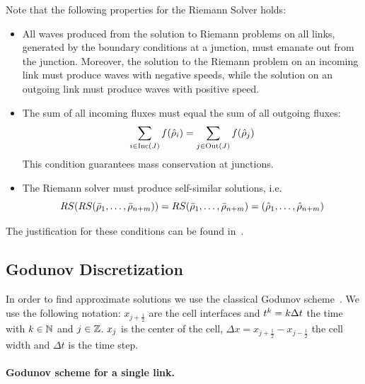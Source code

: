 				
		Note that the following properties for the Riemann Solver holds:
		\begin{itemize}
			\item All waves produced from the solution to Riemann problems on all links,
			generated by the boundary conditions at a junction, must emanate out
			from the junction. Moreover, the solution to the Riemann problem
			on an incoming link must produce waves with negative speeds, while
			the solution on an outgoing link must produce waves with positive
			speed. 
			\item The sum of all incoming fluxes must equal the sum of all outgoing
			fluxes: 
			\[
				\sum_{i\in\Inc\left(\jn\right)}f\left(\trace{\cvar}_{\link}\right)=\sum_{j\in\Out\left(\jn\right)}f\left(\trace{\cvar}_{j}\right)
			\]
			This condition guarantees mass conservation at junctions.
			\item The Riemann solver must produce self-similar solutions, i.e. 
			\[
				\RS\left(\RS\tuple{\initstate_{1}}{\initstate_{\ninc+\nout}}\right)=\RS\tuple{\initstate_{1}}{\initstate_{\ninc+\nout}}=\tuple{\trace{\cvar}_{1}}{\trace{\cvar}_{\ninc+\nout}}
			\]
		\end{itemize}
				
		The justification for these conditions can be found in~\cite{garavello2006traffic}.
				
				
		\subsection{Godunov Discretization\label{sub:Godunov-Discretization}}
				
		In order to find approximate solutions we use the classical Godunov scheme~\cite{godunov1959}. We use the following notation: $x_{j+\frac{1}{2}}$ are the cell interfaces and   $t^{k}=k\Delta t$ the time with $k\in\mathbb{N}$ and $j\in\mathbb{Z}$. $x_{j}$ is the center of the cell, $\Delta x=x_{j+\frac{1}{2}}-x_{j-\frac{1}{2}}$ the cell width and $\Delta t$ is the time step. 
		\paragraph{Godunov scheme for a single link.}
				
